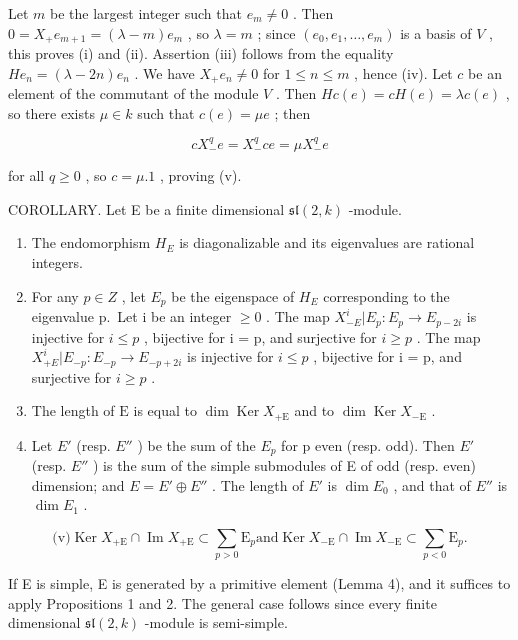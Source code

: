 Let \(m\) be the largest integer such that \(e_m \neq 0\) . Then \(0 = X_{+}e_{m+1} = (\lambda - m)e_m\) , so \(\lambda = m\) ; since \((e_0, e_1, \ldots, e_m)\) is a basis of \(V\) , this proves (i) and (ii). Assertion (iii) follows from the equality \(He_n = (\lambda - 2n)e_n\) . We have \(X_{+}e_n \neq 0\) for \(1 \leq n \leq m\) , hence (iv). Let \(c\) be an element of the commutant of the module \(V\) . Then \(Hc(e) = cH(e) = \lambda c(e)\) , so there exists \(\mu \in k\) such that \(c(e) = \mu e\) ; then

\[
c X _ {-} ^ {q} e = X _ {-} ^ {q} c e = \mu X _ {-} ^ {q} e
\]

for all \(q \geq 0\) , so \(c = \mu.1\) , proving (v).

COROLLARY. Let E be a finite dimensional \(\mathfrak{sl}(2,k)\) -module.

\begin{enumerate}
\def\labelenumi{(\roman{enumi})}
\item
  The endomorphism \(H_{E}\) is diagonalizable and its eigenvalues are rational integers.
\item
  For any \(p \in Z\) , let \(E_{p}\) be the eigenspace of \(H_{E}\) corresponding to the eigenvalue p.~Let i be an integer \(\geq 0\) . The map \(X_{-E}^{i}|E_{p}:E_{p} \to E_{p-2i}\) is injective for \(i \leq p\) , bijective for i = p, and surjective for \(i \geq p\) . The map \(X_{+E}^{i}|E_{-p}:E_{-p} \to E_{-p+2i}\) is injective for \(i \leq p\) , bijective for i = p, and surjective for \(i \geq p\) .
\item
  The length of \(\mathrm{E}\) is equal to \(\dim \operatorname{Ker} X_{+\mathrm{E}}\) and to \(\dim \operatorname{Ker} X_{-\mathrm{E}}\) .
\item
  Let \(E'\) (resp. \(E''\) ) be the sum of the \(E_{p}\) for p even (resp. odd). Then \(E'\) (resp. \(E''\) ) is the sum of the simple submodules of E of odd (resp. even) dimension; and \(E = E' \oplus E''\) . The length of \(E'\) is \(\dim E_{0}\) , and that of \(E''\) is \(\dim E_{1}\) .
\end{enumerate}

\[
\text {(v)} \operatorname{Ker} X _ {+ \mathrm{E}} \cap \operatorname{Im} X _ {+ \mathrm{E}} \subset \sum_ {p > 0} \mathrm{E} _ {p} \text {and} \operatorname{Ker} X _ {- \mathrm{E}} \cap \operatorname{Im} X _ {- \mathrm{E}} \subset \sum_ {p <   0} \mathrm{E} _ {p}.
\]

If E is simple, E is generated by a primitive element (Lemma 4), and it suffices to apply Propositions 1 and 2. The general case follows since every finite dimensional \(\mathfrak{sl}(2,k)\) -module is semi-simple.

